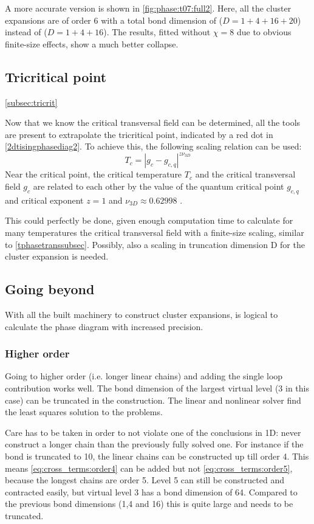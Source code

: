 A more accurate version is shown in \cref{fig:phase:t07:full2}. Here, all the cluster expansions are of order 6 with a total bond dimension of ($D = 1+4+16+20$) instead of ($D = 1+4+16$). The results, fitted without $\chi=8$ due to obvious finite-size effects, show a much better collapse.

\subsection{Tricritical point}\cref{subsec:tricrit}

Now that we know the critical transversal field can be determined, all the tools are present to extrapolate the tricritical point, indicated by a red dot in \cref{2dtisingphasediag2}. To achieve this, the following scaling relation can be used:
\begin{equation}
    T_c = \left| g_c-g_{c,q} \right|^{z \nu_{3D}}
\end{equation}
Near the critical point, the critical temperature $T_c$ and the critical transversal field $g_c$ are related to each other by the value of the quantum critical point $g_{c,q}$ and critical exponent $z=1$ and $\nu_{3D} \approx 0.62998$ \cite{Hesselmann2016}.

This could perfectly be done, given enough computation time to calculate for many temperatures the critical transversal field with a finite-size scaling, similar to \cref{tphasetranssubsec}. Possibly, also a scaling in truncation dimension D for the cluster expansion is needed.

\subsection{Going beyond}
With all the built machinery to construct cluster expansions, is logical to calculate the phase diagram with increased precision.

\subsubsection{Higher order}

Going to higher order (i.e. longer linear chains) and adding the single loop contribution works well. The bond dimension of the largest virtual level (3 in this case) can be truncated in the construction. The linear and nonlinear solver find the least squares solution to the problems.

Care has to be taken in order to not violate one of the conclusions in 1D: never construct a longer chain than the previously fully solved one. For instance if the bond is truncated to 10, the linear chains can be constructed up till order 4. This means \cref{eq:cross_terms:order4} can be added but not \cref{eq:cross_terms:order5}, because the longest chains are order 5. Level 5 can still be constructed and contracted easily, but virtual level 3 has a bond dimension of 64. Compared to the previous bond dimensions (1,4 and 16) this is quite large and needs to be truncated.


